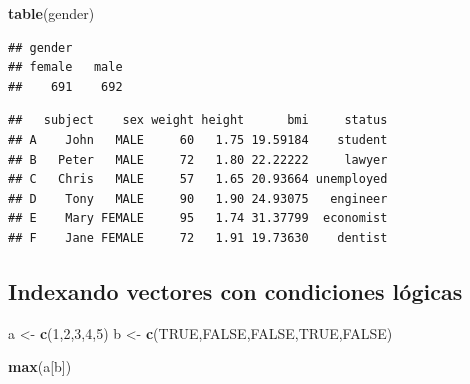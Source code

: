 \documentclass[]{article}
\newenvironment{Shaded}{\begin{snugshade}}{\end{snugshade}}
\newcommand{\KeywordTok}[1]{\textcolor[rgb]{0.13,0.29,0.53}{\textbf{{#1}}}}
\newcommand{\DataTypeTok}[1]{\textcolor[rgb]{0.13,0.29,0.53}{{#1}}}
\newcommand{\DecValTok}[1]{\textcolor[rgb]{0.00,0.00,0.81}{{#1}}}
\newcommand{\StringTok}[1]{\textcolor[rgb]{0.31,0.60,0.02}{{#1}}}
\newcommand{\CommentTok}[1]{\textcolor[rgb]{0.56,0.35,0.01}{\textit{{#1}}}}
\newcommand{\OtherTok}[1]{\textcolor[rgb]{0.56,0.35,0.01}{{#1}}}
\newcommand{\NormalTok}[1]{{#1}}
\numberwithin{equation}{section}
\begin{document}
\begin{Shaded}
\begin{Highlighting}[]
\KeywordTok{table}\NormalTok{(gender)}
\end{Highlighting}
\end{Shaded}

\begin{verbatim}
## gender
## female   male 
##    691    692
\end{verbatim}

\begin{Shaded}
\end{Shaded}

\begin{verbatim}
##   subject    sex weight height      bmi     status
## A    John   MALE     60   1.75 19.59184    student
## B   Peter   MALE     72   1.80 22.22222     lawyer
## C   Chris   MALE     57   1.65 20.93664 unemployed
## D    Tony   MALE     90   1.90 24.93075   engineer
## E    Mary FEMALE     95   1.74 31.37799  economist
## F    Jane FEMALE     72   1.91 19.73630    dentist
\end{verbatim}

\subsection{Indexando vectores con condiciones
lógicas}\label{indexando-vectores-con-condiciones-logicas}

\begin{Shaded}
\begin{Highlighting}[]
\NormalTok{a <-}\StringTok{ }\KeywordTok{c}\NormalTok{(}\DecValTok{1}\NormalTok{,}\DecValTok{2}\NormalTok{,}\DecValTok{3}\NormalTok{,}\DecValTok{4}\NormalTok{,}\DecValTok{5}\NormalTok{)}
\NormalTok{b <-}\StringTok{ }\KeywordTok{c}\NormalTok{(}\OtherTok{TRUE}\NormalTok{,}\OtherTok{FALSE}\NormalTok{,}\OtherTok{FALSE}\NormalTok{,}\OtherTok{TRUE}\NormalTok{,}\OtherTok{FALSE}\NormalTok{)}

\KeywordTok{max}\NormalTok{(a[b])}
\end{Highlighting}
\end{Shaded}
\end{document}
